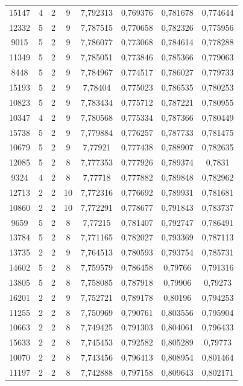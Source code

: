 \begin{longtable}{|c|c|c|c|c|c|c|c|}
15147 & 4 & 2 & 9 & 7,792313 & 0,769376 & 0,781678 & 0,774644 \\
12332 & 5 & 2 & 9 & 7,787515 & 0,770658 & 0,782326 & 0,775956 \\
9015 & 5 & 2 & 9 & 7,786077 & 0,773068 & 0,784614 & 0,778288 \\
11349 & 5 & 2 & 9 & 7,785051 & 0,773846 & 0,785366 & 0,779063 \\
8448 & 5 & 2 & 9 & 7,784967 & 0,774517 & 0,786027 & 0,779733 \\
15193 & 5 & 2 & 9 & 7,78404 & 0,775023 & 0,786535 & 0,780253 \\
10823 & 5 & 2 & 9 & 7,783434 & 0,775712 & 0,787221 & 0,780955 \\
10347 & 4 & 2 & 9 & 7,780568 & 0,775334 & 0,787366 & 0,780449 \\
15738 & 5 & 2 & 9 & 7,779884 & 0,776257 & 0,787733 & 0,781475 \\
10679 & 5 & 2 & 9 & 7,77921 & 0,777438 & 0,788907 & 0,782635 \\
12085 & 5 & 2 & 8 & 7,777353 & 0,777926 & 0,789374 & 0,7831 \\
9324 & 4 & 2 & 8 & 7,77718 & 0,777882 & 0,789848 & 0,782962 \\
12713 & 2 & 2 & 10 & 7,772316 & 0,776692 & 0,789931 & 0,781681 \\
10860 & 2 & 2 & 10 & 7,772291 & 0,778677 & 0,791843 & 0,783737 \\
9659 & 5 & 2 & 8 & 7,77215 & 0,781407 & 0,792747 & 0,786491 \\
13784 & 5 & 2 & 8 & 7,771165 & 0,782027 & 0,793369 & 0,787113 \\
13735 & 2 & 2 & 9 & 7,764513 & 0,780593 & 0,793754 & 0,785731 \\
14602 & 5 & 2 & 8 & 7,759579 & 0,786458 & 0,79766 & 0,791316 \\
13805 & 5 & 2 & 8 & 7,758085 & 0,787918 & 0,79906 & 0,79273 \\
16201 & 2 & 2 & 9 & 7,752721 & 0,789178 & 0,80196 & 0,794253 \\
11255 & 2 & 2 & 8 & 7,750969 & 0,790761 & 0,803556 & 0,795904 \\
10663 & 2 & 2 & 8 & 7,749425 & 0,791303 & 0,804061 & 0,796433 \\
15633 & 2 & 2 & 8 & 7,745453 & 0,792582 & 0,805289 & 0,79773 \\
10070 & 2 & 2 & 8 & 7,743456 & 0,796413 & 0,808954 & 0,801464 \\
11197 & 2 & 2 & 8 & 7,742888 & 0,797158 & 0,809643 & 0,802171 \\

\end{longtable}
